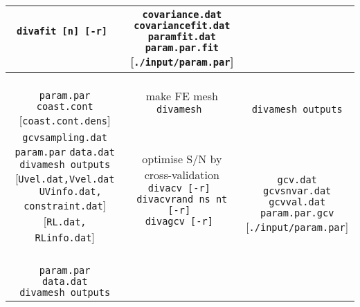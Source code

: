 \documentclass[8pt,a4paper,notitlepage]{book}
\begin{document}
\begin{table}
\begin{center}
{{\begin{tabular}{c|c|c}
{{\tt divafit [n] [-r]  } 
\\
{  { }  } \\
{  { }  }
}
& 
\shortstack{
{\tt covariance.dat} \\
{\tt covariancefit.dat} \\
{\tt paramfit.dat} \\
{\tt param.par.fit} {  { }  } [{\tt ./input/param.par}]
}
\\ \hline
 \shortstack{
 {  { }  } \\
{\tt param.par} \\
{\tt coast.cont} \\
{ [{\tt coast.cont.dens}]  } 
}
 & 
\shortstack{
{\sf make FE mesh} \\
{\tt divamesh    } 
\\
{  { }  }
}
& 
\shortstack{
{  { }  } \\
{\tt divamesh outputs} \\
{  { }  } 
} 
\\ \hline
 \shortstack{
 {\tt gcvsampling.dat} \\
 {\tt param.par} \\
 {\tt data.dat} \\
 {\tt divamesh outputs} \\
 {[{\tt Uvel.dat,Vvel.dat}} \\
 { $\quad ${\tt UVinfo.dat, constraint.dat}]} \\
 {[{\tt RL.dat, RLinfo.dat}]} 
 }
 & 
\shortstack{
{  { }  } \\
{\sf optimise S/N by cross-validation} \\
{\tt divacv [-r]   } \\
{\tt divacvrand ns nt [-r] }  \\
{\tt divagcv [-r]   } \\
{  { }  } \\
{  { }  }
}
& 
\shortstack{
{  { }  } \\
{  { }  } \\
{\tt gcv.dat} \\
{\tt gcvsnvar.dat} \\
{\tt gcvval.dat} \\
{\tt param.par.gcv} {[{\tt ./input/param.par}] } \\
{  { }  } 
} 
\\ \hline
 \shortstack{
 {  { }  } \\
 {\tt param.par} \\
 {\tt data.dat} \\
 {\tt divamesh outputs} \\
}
\end{tabular}}}
\end{center}
\end{table}
\end{document}
